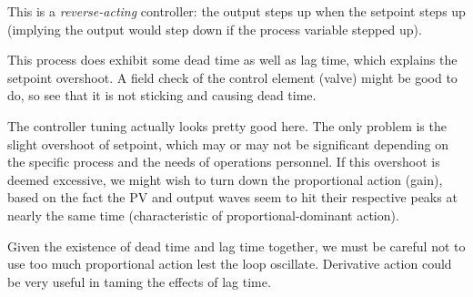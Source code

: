 This is a {\it reverse-acting} controller: the output steps up when the setpoint steps up (implying the output would step down if the process variable stepped up).

\vskip 10pt

This process does exhibit some dead time as well as lag time, which explains the setpoint overshoot.  A field check of the control element (valve) might be good to do, so see that it is not sticking and causing dead time. 

\vskip 10pt
  
The controller tuning actually looks pretty good here.  The only problem is the slight overshoot of setpoint, which may or may not be significant depending on the specific process and the needs of operations personnel.  If this overshoot is deemed excessive, we might wish to turn down the proportional action (gain), based on the fact the PV and output waves seem to hit their respective peaks at nearly the same time (characteristic of proportional-dominant action).

\vskip 10pt

Given the existence of dead time and lag time together, we must be careful not to use too much proportional action lest the loop oscillate.  Derivative action could be very useful in taming the effects of lag time.











